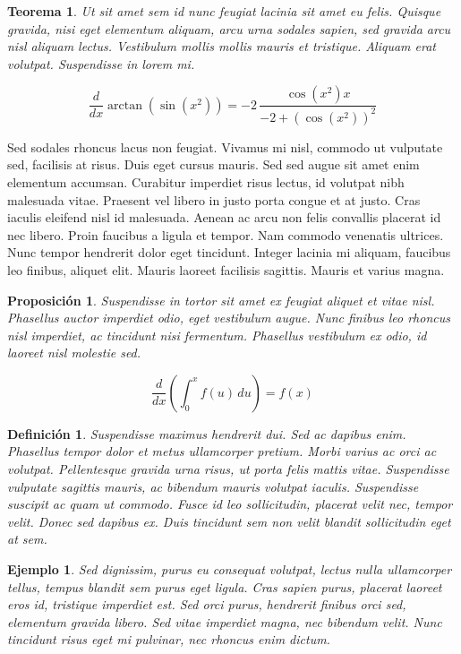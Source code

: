 \documentclass[10pt, a4paper]{article}
\makeatletter
\renewenvironment{proof}[1][\proofname] {\par\pushQED{\qed}\normalfont\topsep6\p@\@plus6\p@\relax\trivlist\item[\hskip\labelsep\itshape\sffamily#1\@addpunct{.}]\ignorespaces}{\popQED\endtrivlist\@endpefalse}
\theoremstyle{theorem-style}
\newtheorem{nth}{Teorema}[section]
\newtheorem{nprop}{Proposición}[section]
\theoremstyle{definition-style}
\newtheorem{ndef}{Definición}[section]
\theoremstyle{remark-style}
\theoremstyle{example-style}
\newtheorem{ejemplo}{Ejemplo}[section]
\theoremstyle{definition-style}
\theoremstyle{remark-style}
\makeatother
\begin{document}
\begin{nth}
  Ut sit amet sem id nunc feugiat lacinia sit amet eu felis. Quisque gravida, nisi eget elementum aliquam, arcu urna sodales sapien, sed gravida arcu nisl aliquam lectus. Vestibulum mollis mollis mauris et tristique. Aliquam erat volutpat. Suspendisse in lorem mi.

  $${\frac {d}{dx}}\arctan(\sin({x}^{2}))=-2\,{\frac {\cos({x}^{2})x}{-2+ \left (\cos({x}^{2})\right )^{2}}}$$
\end{nth}

\begin{proof}
  Sed sodales rhoncus lacus non feugiat. Vivamus mi nisl, commodo ut vulputate sed, facilisis at risus. Duis eget cursus mauris. Sed sed augue sit amet enim elementum accumsan. Curabitur imperdiet risus lectus, id volutpat nibh malesuada vitae. Praesent vel libero in justo porta congue et at justo. Cras iaculis eleifend nisl id malesuada. Aenean ac arcu non felis convallis placerat id nec libero. Proin faucibus a ligula et tempor. Nam commodo venenatis ultrices. Nunc tempor hendrerit dolor eget tincidunt. Integer lacinia mi aliquam, faucibus leo finibus, aliquet elit. Mauris laoreet facilisis sagittis. Mauris et varius magna.
\end{proof}

\begin{nprop}
  Suspendisse in tortor sit amet ex feugiat aliquet et vitae nisl. Phasellus auctor imperdiet odio, eget vestibulum augue. Nunc finibus leo rhoncus nisl imperdiet, ac tincidunt nisi fermentum. Phasellus vestibulum ex odio, id laoreet nisl molestie sed.

  $$\frac{d}{dx}\left( \int_{0}^{x} f(u)\,du\right)=f(x)$$
\end{nprop}

\begin{ndef}
  Suspendisse maximus hendrerit dui. Sed ac dapibus enim. Phasellus tempor dolor et metus ullamcorper pretium. Morbi varius ac orci ac volutpat. Pellentesque gravida urna risus, ut porta felis mattis vitae. Suspendisse vulputate sagittis mauris, ac bibendum mauris volutpat iaculis. Suspendisse suscipit ac quam ut commodo. Fusce id leo sollicitudin, placerat velit nec, tempor velit. Donec sed dapibus ex. Duis tincidunt sem non velit blandit sollicitudin eget at sem.
\end{ndef}

\begin{ejemplo}
  Sed dignissim, purus eu consequat volutpat, lectus nulla ullamcorper tellus, tempus blandit sem purus eget ligula. Cras sapien purus, placerat laoreet eros id, tristique imperdiet est. Sed orci purus, hendrerit finibus orci sed, elementum gravida libero. Sed vitae imperdiet magna, nec bibendum velit. Nunc tincidunt risus eget mi pulvinar, nec rhoncus enim dictum.
\end{ejemplo}
\end{document}
